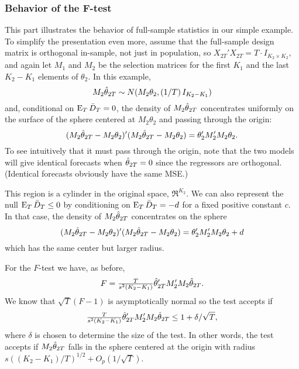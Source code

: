 \documentclass[12pt]{article}
\begin{document}
\subsubsection*{Behavior of the F-test}

This part illustrates the behavior of full-sample statistics in our
simple example. To simplify the presentation even more, assume that
the full-sample design matrix is orthogonal in-sample, not just in
population, so $X_{2T}'X_{2T} = T \cdot I_{K_2 \times K_2}$, and again
let $M_1$ and $M_2$ be the selection matrices for the first $K_1$ and
the last $K_2-K_1$ elements of $\theta_2$. In this example,
\begin{equation*}
  M_2 \hat\theta_{2T} \sim
  N(M_2 \theta_2, (1/T) \, I_{K_2-K_1})
\end{equation*}
and, conditional on $\operatorname{E}_T \bar{D}_{T} = 0$, the density of $M_2 \hat\theta_{2T}$
concentrates uniformly on the surface of the sphere centered at $M_2
\theta_2$ and passing through the origin:
\begin{equation*}
  (M_2 \hat\theta_{2T} - M_2 \theta_2)'(M_2 \hat\theta_{2T} - M_2 \theta_2) =
  \theta_2'M_2' M_2 \theta_2.
\end{equation*}
To see intuitively that it must pass through the origin, note that the
two models will give identical forecasts when $\hat\theta_{2T} = 0$ since the
regressors are orthogonal. (Identical forecasts obviously have the
same MSE.)

This region is a cylinder in the original space, $\Re^{K_2}$.  We can
also represent the null $\operatorname{E}_T \bar{D}_{T} \leq 0$ by conditioning on $\operatorname{E}_T
\bar{D}_{T} = -d$ for a fixed positive constant $c$. In that case, the
density of $M_2 \hat\theta_{2T}$ concentrates on the sphere
\begin{equation*}
  (M_2 \hat\theta_{2T} - M_2 \theta_2)'(M_2 \hat\theta_{2T} - M_2 \theta_2) =
  \theta_2'M_2' M_2 \theta_2 + d
\end{equation*}
which has the same center but larger radius.

For the $F$-test we have, as before,
\begin{equation*}
  F = \tfrac{T}{s^2 (K_2 - K_1)} \hat\theta_{2T}' M_2' M_2 \hat\theta_{2T}.
\end{equation*}
We know that $\sqrt{T}(F - 1)$ is asymptotically normal
\citep{Cal:11c} so the test accepts if
\begin{equation}\label{eq:26}
  \tfrac{T}{s^2 (K_2 - K_1)} \hat\theta_{2T}' M_2' M_2 \hat\theta_{2T}
  \leq 1 + \delta / \sqrt{T},
\end{equation}
where $\delta$ is chosen to determine the size of the test. In other
words, the test accepts if $M_2 \hat\theta_{2T}$ falls in the sphere centered
at the origin with radius $s ((K_2 - K_1) / T)^{1/2} +
O_p(1/\sqrt{T})$.
\end{document}
